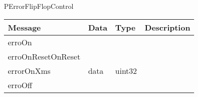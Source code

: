  {PErrorFlipFlopControl}

\begin{tabular}[ht]{|l|l|l|p{8cm}|}
\hline
Message & Data & Type & Description\\
\hline
erroOn &  &  & \\
\hline
erroOnResetOnReset &  &  & \\
\hline
errorOnXms &  data  &  uint32  & \\
\hline
erroOff &  &  & \\
\hline
\end{tabular}
